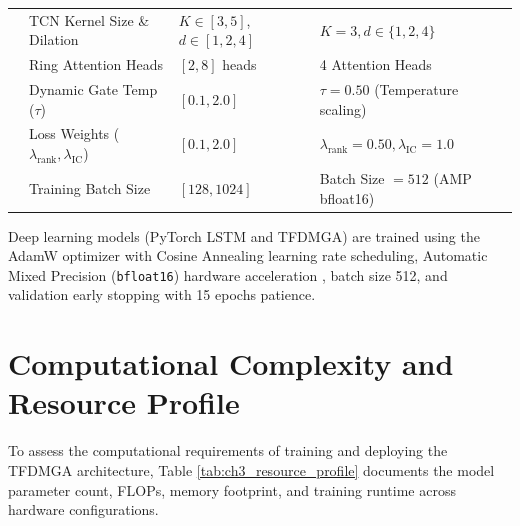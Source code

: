 \begin{table}[htbp]
{\begin{tabular}{llll}
 & TCN Kernel Size \& Dilation & $K \in [3, 5]$, $d \in [1, 2, 4]$ & $K = 3, d \in \{1, 2, 4\}$ \\
 & Ring Attention Heads & $[2, 8]$ heads & 4 Attention Heads \\
 & Dynamic Gate Temp ($\tau$) & $[0.1, 2.0]$ & $\tau = 0.50$ (Temperature scaling) \\
 & Loss Weights ($\lambda_{\text{rank}}, \lambda_{\operatorname{IC}}$) & $[0.1, 2.0]$ & $\lambda_{\text{rank}} = 0.50, \lambda_{\operatorname{IC}} = 1.0$ \\
 & Training Batch Size & $[128, 1024]$ & Batch Size $= 512$ (AMP bfloat16) \\
\bottomrule
\end{tabular}%
}
\end{table}

Deep learning models (PyTorch LSTM and TFDMGA) are trained using the AdamW optimizer \citep{loshchilov2018decoupled} with Cosine Annealing learning rate scheduling, Automatic Mixed Precision (\texttt{bfloat16}) hardware acceleration \citep{kalamkar2019bfloat16}, batch size 512, and validation early stopping with 15 epochs patience.

\section{Computational Complexity and Resource Profile}
\label{sec:ch3_computational_complexity}

To assess the computational requirements of training and deploying the TFDMGA architecture, Table \ref{tab:ch3_resource_profile} documents the model parameter count, FLOPs, memory footprint, and training runtime across hardware configurations.

